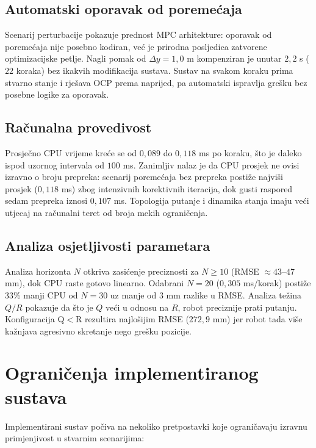 \subsection*{Automatski oporavak od poremećaja}

Scenarij perturbacije pokazuje prednost MPC arhitekture: oporavak od poremećaja nije posebno kodiran, već je prirodna posljedica zatvorene optimizacijske petlje. Nagli pomak od $\Delta y = 1{,}0$ m kompenziran je unutar $2{,}2$ s ($22$ koraka) bez ikakvih modifikacija sustava. Sustav na svakom koraku prima stvarno stanje i rješava OCP prema naprijed, pa automatski ispravlja grešku bez posebne logike za oporavak.

\subsection*{Računalna provedivost}

Prosječno CPU vrijeme kreće se od $0{,}089$ do $0{,}118$ ms po koraku, što je daleko ispod uzornog intervala od $100$ ms. Zanimljiv nalaz je da CPU prosjek ne ovisi izravno o broju prepreka: scenarij poremećaja bez prepreka postiže najviši prosjek ($0{,}118$ ms) zbog intenzivnih korektivnih iteracija, dok gusti raspored sedam prepreka iznosi $0{,}107$ ms. Topologija putanje i dinamika stanja imaju veći utjecaj na računalni teret od broja mekih ograničenja.

\subsection*{Analiza osjetljivosti parametara}

Analiza horizonta $N$ otkriva zasićenje preciznosti za $N \geq 10$ (RMSE $\approx 43$--$47$ mm), dok CPU raste gotovo linearno. Odabrani $N = 20$ ($0{,}305$ ms/korak) postiže $33$\% manji CPU od $N = 30$ uz manje od $3$ mm razlike u RMSE. Analiza težina $Q/R$ pokazuje da što je $Q$ veći u odnosu na $R$, robot preciznije prati putanju. Konfiguracija Q$<$R rezultira najlošijim RMSE ($272{,}9$ mm) jer robot tada više kažnjava agresivno skretanje nego grešku pozicije.

\section{Ograničenja implementiranog sustava}

Implementirani sustav počiva na nekoliko pretpostavki koje ograničavaju izravnu primjenjivost u stvarnim scenarijima:

